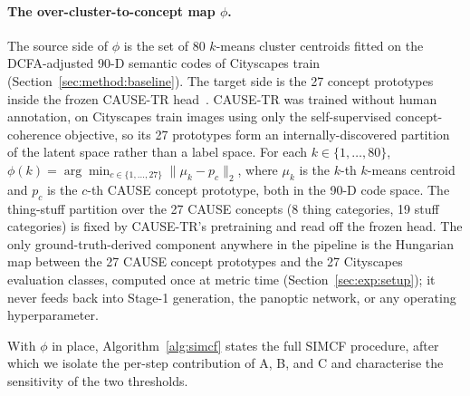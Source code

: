\documentclass{article}
\begin{document}
\paragraph{The over-cluster-to-concept map $\phi$.}
\label{sec:supp:impl:phi}
The source side of $\phi$ is the set of 80 $k$-means cluster centroids fitted on the DCFA-adjusted 90-D semantic codes of Cityscapes train (Section~\ref{sec:method:baseline}). The target side is the 27 concept prototypes inside the frozen CAUSE-TR head~\cite{kim2024cause}. CAUSE-TR was trained without human annotation, on Cityscapes train images using only the self-supervised concept-coherence objective, so its 27 prototypes form an internally-discovered partition of the latent space rather than a label space. For each $k \in \{1, \dots, 80\}$, $\phi(k) = \arg\min_{c \in \{1, \dots, 27\}} \|\mu_k - p_c\|_2$, where $\mu_k$ is the $k$-th $k$-means centroid and $p_c$ is the $c$-th CAUSE concept prototype, both in the 90-D code space. The thing-stuff partition over the 27 CAUSE concepts (8 thing categories, 19 stuff categories) is fixed by CAUSE-TR's pretraining and read off the frozen head. The only ground-truth-derived component anywhere in the pipeline is the Hungarian map between the 27 CAUSE concept prototypes and the 27 Cityscapes evaluation classes, computed once at metric time (Section~\ref{sec:exp:setup}); it never feeds back into Stage-1 generation, the panoptic network, or any operating hyperparameter.

With $\phi$ in place, Algorithm~\ref{alg:simcf} states the full SIMCF procedure, after which we isolate the per-step contribution of A, B, and C and characterise the sensitivity of the two thresholds.
\end{document}
